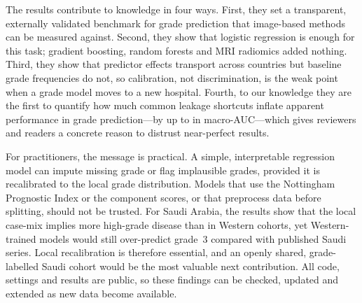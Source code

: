 The results contribute to knowledge in four ways. First, they set a transparent, externally
validated benchmark for grade prediction that image-based methods can be measured against. Second,
they show that logistic regression is enough for this task; gradient boosting, random forests and MRI
radiomics added nothing. Third, they show that predictor effects transport across countries but
baseline grade frequencies do not, so calibration, not discrimination, is the weak point when a
grade model moves to a new hospital. Fourth, to our knowledge they are the first to quantify how much common
leakage shortcuts inflate apparent performance in grade prediction---by up to \LeakMaxInfl{} in
macro-AUC---which gives reviewers and readers a concrete reason to distrust near-perfect results.

For practitioners, the message is practical. A simple, interpretable regression model can impute
missing grade or flag implausible grades, provided it is recalibrated to the local grade
distribution. Models that use the Nottingham Prognostic Index or the component scores, or that
preprocess data before splitting, should not be trusted. For Saudi Arabia, the results show that the
local case-mix implies more high-grade disease than in Western cohorts, yet Western-trained models
would still over-predict grade~3 compared with published Saudi series. Local recalibration is
therefore essential, and an openly shared, grade-labelled Saudi cohort would be the most valuable
next contribution. All code, settings and results are public, so these findings can be checked,
updated and extended as new data become available.
